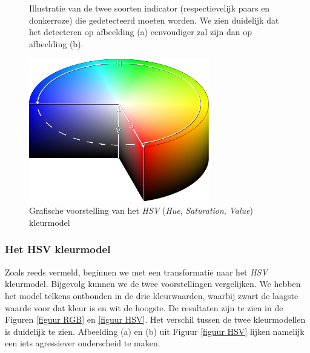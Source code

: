 \documentclass[a4paper,kulak]{kulakarticle}
\begin{document}
	\begin{figure}[H]
		\centering
		\qquad
		
		\caption{Illustratie van de twee soorten indicator (respectievelijk paars en donkerroze) die gedetecteerd moeten worden. We zien duidelijk dat het detecteren op afbeelding (a) eenvoudiger zal zijn dan op afbeelding (b).}
		\label{figuur indicators}
	\end{figure}

	\begin{figure}[H]
		\centering
		\includegraphics[width=0.7\textwidth]{HSV_vb.png}
		
		\caption{Grafische voorstelling van het \textit{HSV} (\textit{Hue}, \textit{Saturation}, \textit{Value}) kleurmodel}
		\label{figuur hsv_schema}
	\end{figure}

	\subsubsection{Het HSV kleurmodel}
		Zoals reeds vermeld, beginnen we met een transformatie naar het \textit{HSV} kleurmodel. Bijgevolg kunnen we de twee voorstellingen vergelijken. We hebben het model telkens ontbonden in de drie kleurwaarden, waarbij zwart de laagste waarde voor dat kleur is en wit de hoogste. De resultaten zijn te zien in de Figuren \ref{figuur RGB} en \ref{figuur HSV}. Het verschil tussen de twee kleurmodellen is duidelijk te zien. Afbeelding (a) en (b) uit Figuur \ref{figuur HSV} lijken namelijk een iets agressiever onderscheid te maken.
\end{document}
